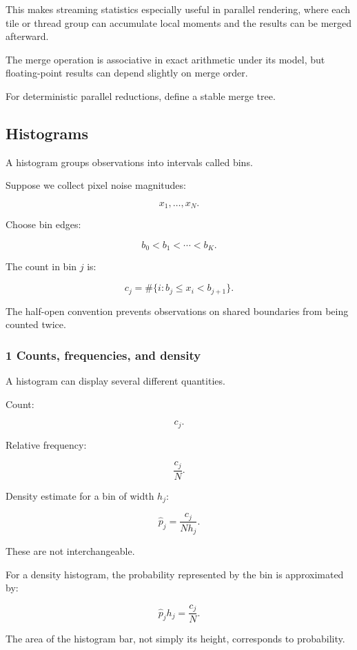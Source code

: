 This makes streaming statistics especially useful in parallel rendering, where each tile or thread group can accumulate local moments and the results can be merged afterward.

The merge operation is associative in exact arithmetic under its model, but floating-point results can depend slightly on merge order.

For deterministic parallel reductions, define a stable merge tree.

\subsection{Histograms}\label{02-foundations-ii-ch030-histograms}

A histogram groups observations into intervals called bins.

Suppose we collect pixel noise magnitudes:

\[
 x_1,\ldots,x_N.
\]

Choose bin edges:

\[
 b_0<b_1<\cdots<b_K.
\]

The count in bin \(j\) is:

\[
 \boxed{ c_j= \#\{i:b_j\le x_i < b_{j+1}\} }.
\]

The half-open convention prevents observations on shared boundaries from being counted twice.

\subsubsection{1 Counts, frequencies, and density}\label{02-foundations-ii-ch030-counts-frequencies-and-density}

A histogram can display several different quantities.

Count:

\[
 c_j.
\]

Relative frequency:

\[
 \frac{c_j}{N}.
\]

Density estimate for a bin of width \(h_j\):

\[
 \boxed{ \hat p_j= \frac{c_j}{Nh_j} }.
\]

These are not interchangeable.

For a density histogram, the probability represented by the bin is approximated by:

\[
 \hat p_jh_j=\frac{c_j}{N}.
\]

The area of the histogram bar, not simply its height, corresponds to probability.

